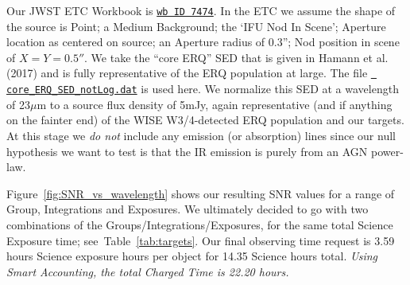 \smallskip \smallskip 
\noindent
Our JWST ETC Workbook is
\href{https://jwst.etc.stsci.edu/workbook.html?wb_id=7474}{{\tt wb ID
7474}}.  In the ETC we assume the shape of the source is Point; a
Medium Background; the `IFU Nod In Scene'; Aperture location as
centered on source; an Aperture radius of 0.3''; Nod position in scene
of $X=Y=0.5''$.  We take the ``core ERQ'' SED that is given in Hamann
et al. (2017) and is fully representative of the ERQ population at
large.  The file
\href{https://github.com/d80b2t/JWST_ERS/blob/master/ETC_calcs/core_ERQ_SED_notLog.dat}{\tt
core\_ERQ\_SED\_notLog.dat} is used here.  We normalize this SED at a
wavelength of 23$\mu$m to a source flux density of 5mJy, again
representative (and if anything on the fainter end) of the WISE
W3/4-detected ERQ population and our targets.  At this stage we {\it
do not} include any emission (or absorption) lines since our null
hypothesis we want to test is that the IR emission is purely from an
AGN power-law.

\smallskip \smallskip 
\noindent
Figure~\ref{fig:SNR_vs_wavelength} shows our resulting SNR 
values for a range of Group, Integrations and Exposures. 
We ultimately decided to go with two combinations of the
Groups/Integrations/Exposures, for the same total Science Exposure
time; see~Table~\ref{tab:targets}.  
Our final observing time request is 3.59 hours Science exposure hours 
per object for 14.35 Science hours total. 
{\it Using Smart Accounting, the total Charged Time is 22.20 hours.}

